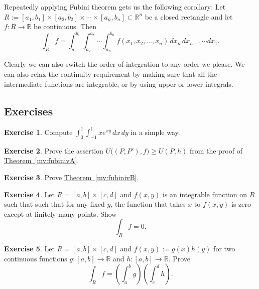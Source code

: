 \documentclass[12pt]{book}
\newcommand{\R}{{\mathbb{R}}}
\theoremstyle{plain}
\theoremstyle{remark}
\theoremstyle{definition}
\theoremstyle{exercise}
\newtheorem{exercise}{Exercise}[section]
\theoremstyle{example}
\newcommand{\thmref}[1]{\hyperref[#1]{Theorem~\ref*{#1}}}
\begin{document}
Repeatedly applying Fubini theorem gets us the following
corollary:
Let $R := [a_1,b_1] \times [a_2,b_2] \times \cdots \times [a_n,b_n] \subset
\R^n$ be a closed rectangle and let
$f \colon R \to \R$ be continuous.  Then
\begin{equation*}
\int_R f = 
\int_{a_1}^{b_1}
\int_{a_2}^{b_2}
\cdots
\int_{a_n}^{b_n}
f(x_1,x_2,\ldots,x_n)
\,
dx_n
\,
dx_{n-1}
\cdots
dx_1 .
\end{equation*}

Clearly we can also switch the order of integration to any order we please.
We can also relax the continuity requirement by making sure that all the
intermediate functions are integrable, or by using upper or lower integrals.

\subsection{Exercises}

\begin{exercise}
Compute $\int_{0}^1 \int_{-1}^1 xe^{xy} \, dx \, dy$ in a simple way.
\end{exercise}

\begin{exercise}
Prove the assertion
$U\bigl((P,P'),f\bigr) \geq U(P,h)$ from the proof
of \thmref{mv:fubinivA}.
\end{exercise}

\begin{exercise}
Prove \thmref{mv:fubinivB}.
\end{exercise}

\begin{exercise}
Let $R=[a,b] \times [c,d]$ and $f(x,y)$ is an integrable
function on $R$ such that
such that for any fixed $y$, the function that takes $x$ to $f(x,y)$
is zero except at finitely many points.  Show
\begin{equation*}
\int_R f = 0 .
\end{equation*}
\end{exercise}

\begin{exercise}
Let $R=[a,b] \times [c,d]$ and $f(x,y) := g(x)h(y)$ for two continuous
functions $g \colon [a,b] \to \R$ and
$h \colon [a,b] \to \R$.  Prove
\begin{equation*}
\int_R f = \left(\int_a^b g\right)\left(\int_c^d h\right) .
\end{equation*}
\end{exercise}

\end{document}
